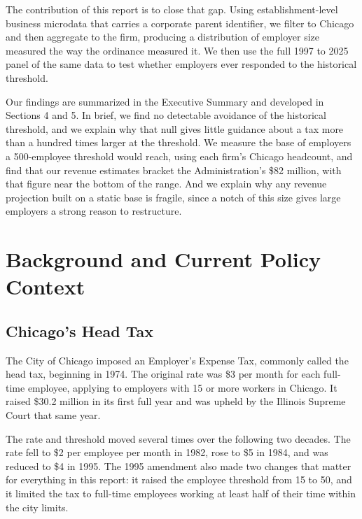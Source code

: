 \documentclass[12pt,letterpaper]{article}
\newif\ifdraft
\newcommand{\NEEDSRC}{\ifdraft\textsuperscript{\textcolor{red}{[src]}}\fi}
\begin{document}
The contribution of this report is to close that gap. Using establishment-level business microdata that carries a corporate parent identifier, we filter to Chicago and then aggregate to the firm, producing a distribution of employer size measured the way the ordinance measured it. We then use the full 1997 to 2025 panel of the same data to test whether employers ever responded to the historical threshold.

Our findings are summarized in the Executive Summary and developed in Sections 4 and 5. In brief, we find no detectable avoidance of the historical threshold, and we explain why that null gives little guidance about a tax more than a hundred times larger at the threshold. We measure the base of employers a 500-employee threshold would reach, using each firm's Chicago headcount, and find that our revenue estimates bracket the Administration's \$82 million, with that figure near the bottom of the range. And we explain why any revenue projection built on a static base is fragile, since a notch of this size gives large employers a strong reason to restructure.

\section{Background and Current Policy Context}

\subsection{Chicago's Head Tax}

The City of Chicago imposed an Employer's Expense Tax, commonly called the head tax, beginning in 1974.\NEEDSRC{} The original rate was \$3 per month for each full-time employee, applying to employers with 15 or more workers in Chicago. It raised \$30.2 million in its first full year and was upheld by the Illinois Supreme Court that same year.

The rate and threshold moved several times over the following two decades. The rate fell to \$2 per employee per month in 1982, rose to \$5 in 1984, and was reduced to \$4 in 1995. The 1995 amendment also made two changes that matter for everything in this report: it raised the employee threshold from 15 to 50, and it limited the tax to full-time employees working at least half of their time within the city limits.
\end{document}

